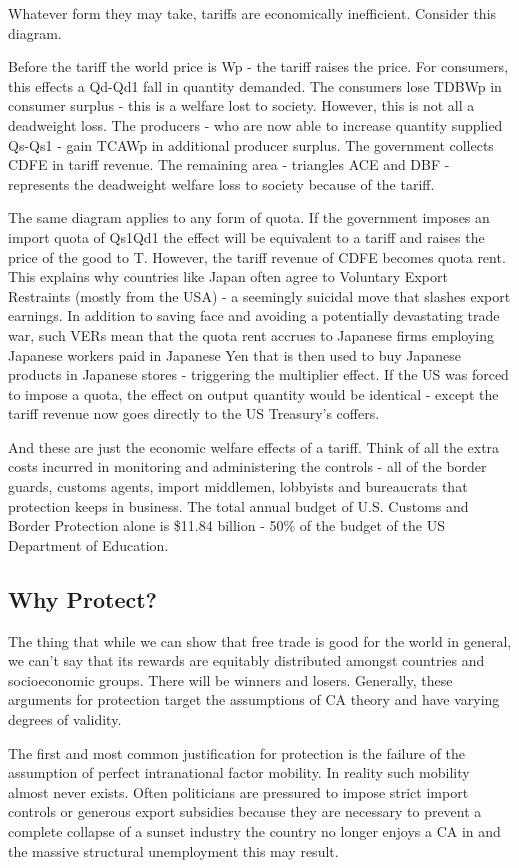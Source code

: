 Whatever form they may take, tariffs are economically inefficient. Consider this diagram.

Before the tariff the world price is Wp - the tariff raises the price. For consumers, this effects a Qd-Qd1 fall in quantity demanded. The consumers lose TDBWp in consumer surplus - this is a welfare lost to society. However, this is not all a deadweight loss. The producers - who are now able to increase quantity supplied Qs-Qs1 - gain TCAWp in additional producer surplus. The government collects CDFE in tariff revenue. The remaining area - triangles ACE and DBF - represents the deadweight welfare loss to society because of the tariff.

The same diagram applies to any form of quota. If the government imposes an import quota of Qs1Qd1 the effect will be equivalent to a tariff and raises the price of the good to T. However, the tariff revenue of CDFE becomes quota rent. This explains why countries like Japan often agree to Voluntary Export Restraints (mostly from the USA) - a seemingly suicidal move that slashes export earnings. In addition to saving face and avoiding a potentially devastating trade war, such VERs mean that the quota rent accrues to Japanese firms employing Japanese workers paid in Japanese Yen that is then used to buy Japanese products in Japanese stores - triggering the multiplier effect. If the US was forced to impose a quota, the effect on output quantity would be identical - except the tariff revenue now goes directly to the US Treasury's coffers.

And these are just the economic welfare effects of a tariff. Think of all the extra costs incurred in monitoring and administering the controls - all of the border guards, customs agents, import middlemen, lobbyists and bureaucrats that protection keeps in business. The total annual budget of U.S. Customs and Border Protection alone is \$11.84 billion - 50\% of the budget of the US Department of Education.
\subsection{Why Protect?}
The thing that while we can show that free trade is good for the world in general, we can't say that its rewards are equitably distributed amongst countries and socioeconomic groups. There will be winners and losers. Generally, these arguments for protection target the assumptions of CA theory and have varying degrees of validity.

The first and most common justification for protection is the failure of the assumption of perfect intranational factor mobility. In reality such mobility almost never exists. Often politicians are pressured to impose strict import controls or generous export subsidies because they are necessary to prevent a complete collapse of a sunset industry the country no longer enjoys a CA in and the massive structural unemployment this may result.

